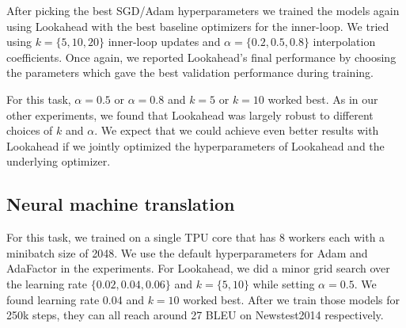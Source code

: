 After picking the best SGD/Adam hyperparameters we trained the models again using Lookahead with the best baseline optimizers for the inner-loop. We tried using $k=\{5,10,20\}$ inner-loop updates and $\alpha = \{ 0.2, 0.5, 0.8\}$ interpolation coefficients. Once again, we reported Lookahead's final performance by choosing the parameters which gave the best validation performance during training.

For this task, $\alpha=0.5$ or $\alpha=0.8$ and $k=5$ or $k=10$ worked best. As in our other experiments, we found that Lookahead was largely robust to different choices of $k$ and $\alpha$. We expect that we could achieve even better results with Lookahead if we jointly optimized the hyperparameters of Lookahead and the underlying optimizer.

\subsection{Neural machine translation}
\label{app:nmt}

For this task, we trained on a single TPU core that has 8 workers each with a minibatch size of 2048. We use the default hyperparameters for Adam \citep{vaswani2017attention} and AdaFactor \citep{adafactor} in the experiments. For Lookahead, we did a minor grid search over the learning rate $\{0.02, 0.04, 0.06\}$ and $k=\{5, 10\}$ while setting $\alpha=0.5$. We found learning rate 0.04 and $k=10$ worked best. After we train those models for 250k steps, they can all reach around 27 BLEU on Newstest2014 respectively.






